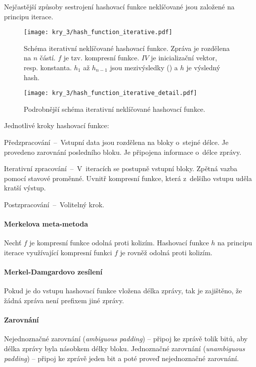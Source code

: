 Nejčastější způsoby sestrojení hashovací funkce neklíčované jsou založené na principu iterace.

\begin{figure}[H]
    \centering
    \texttt{[image: kry\_3/hash\_function\_iterative.pdf]}
    \caption{Schéma iterativní neklíčované hashovací funkce. Zpráva je rozdělena na $n$ částí. $f$ je tzv. kompresní funkce. $IV$ je inicializační vektor, resp. konstanta. $h_1$ až $h_{n-1}$ jsou mezivýsledky () a $h$ je výsledný hash.}
\end{figure}

\begin{figure}[H]
    \centering
    \texttt{[image: kry\_3/hash\_function\_iterative\_detail.pdf]}
    \caption{Podrobnější schéma iterativní neklíčované hashovací funkce.}
\end{figure}

Jednotlivé kroky hashovací funkce: \begin{compactitem}
    \item Předzpracování~--~Vstupní data jsou rozdělena na bloky o~stejné délce. Je provedeno zarovnání posledního bloku. Je připojena informace o~délce zprávy.
    \item Iterativní zpracování~--~V~iteracích se postupně  vstupní bloky. Zpět\-ná vazba pomocí stavové proměnné. Uvnitř kompresní funkce, která z~delšího vstupu uděla kratší výstup.
    \item Postzpracování~--~Volitelný krok.
\end{compactitem}

\paragraph*{Merkelova meta-metoda} Nechť $f$ je kompresní funkce odolná proti kolizím. Hashovací funkce $h$ na principu iterace využívající kompresní funkci $f$ je rovněž odolná proti kolizím.

\paragraph*{Merkel-Damgardovo zesílení} Pokud je do vstupu hashovací funkce vložena délka zprá\-vy, tak je zajištěno, že žádná zpráva není prefixem jiné zprávy.

\paragraph*{Zarovnání} Nejednoznačné zarovnání (\textit{ambiguous padding}) -- připoj ke zprávě tolik bitů, aby délka zprávy byla násobkem délky bloku. Jednoznačné zarovnání (\textit{unambiguous padding}) -- připoj ke zprávě jeden bit a poté proveď nejednoznačné zarovnání.

